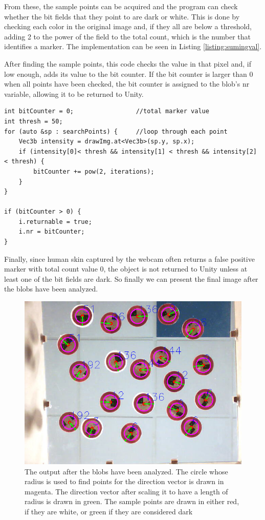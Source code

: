 From these, the sample points can be acquired and the program can check whether the bit fields that they point to are dark or white. This is done by checking each color in the original image and, if they all are below a threshold, adding 2 to the power of the field to the total count, which is the number that identifies a marker. The implementation can be seen in Listing \ref{listing:sumingval}.
 \begin{listing}[H]
 	\caption{After finding the sample points, this code checks the value in that pixel and, if low enough, adds its value to the bit counter. If the bit counter is larger than 0 when all points have been checked, the bit counter is assigned to the blob's nr variable, allowing it to be returned to Unity.}
 	\begin{verbatim}
int bitCounter = 0;					//total marker value
int thresh = 50;
for (auto &sp : searchPoints) {		//loop through each point
	Vec3b intensity = drawImg.at<Vec3b>(sp.y, sp.x);
	if (intensity[0]< thresh && intensity[1] < thresh && intensity[2] < thresh) {
		bitCounter += pow(2, iterations);
	}
}

if (bitCounter > 0) {
	i.returnable = true;
	i.nr = bitCounter;
}
 	\end{verbatim}
 	\label{listing:sumingval}
\end{listing}
Finally, since human skin captured by the webcam often returns a false positive marker with total count value 0, the object is not returned to Unity unless at least one of the bit fields are dark.
So finally we can present the final image after the blobs have been analyzed. 
\begin{figure}[H]
	\centering
	\includegraphics[width=1\linewidth]{figure/Analysis/output.png}
	\caption{The output after the blobs have been analyzed. The circle whose radius is used to find points for the direction vector is drawn in magenta. The direction vector after scaling it to have a length of radius is drawn in green. The sample points are drawn in either red, if they are white, or green if they are considered dark} 
	\label{fig:output}
\end{figure}

